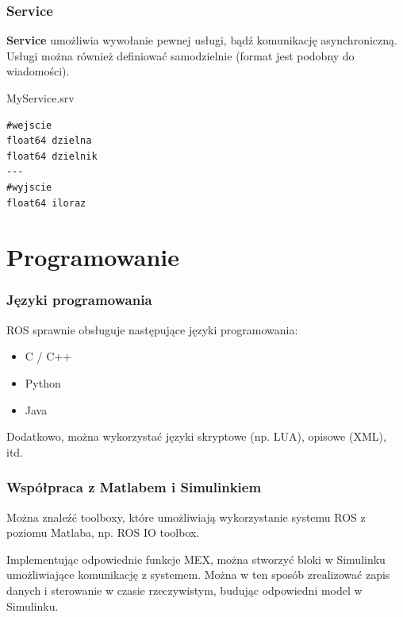 \documentclass[12pt,a4paper,portrait]{beamer}
\begin{document}
\begin{frame}[fragile]
\frametitle{Service}
\textbf{Service} umożliwia wywołanie pewnej usługi, bądź komunikację asynchroniczną. Usługi można również definiować samodzielnie (format jest podobny do wiadomości).

\begin{block}{MyService.srv}
\begin{verbatim}
#wejscie
float64 dzielna
float64 dzielnik
---
#wyjscie
float64 iloraz
\end{verbatim}
\end{block}
\end{frame}



\section{Programowanie}
\begin{frame}
\frametitle{Języki programowania}
ROS sprawnie obsługuje następujące języki programowania:
\begin{itemize}
\item C / C++
\item Python
\item Java
\end{itemize}

Dodatkowo, można wykorzystać języki skryptowe (np. LUA), opisowe (XML), itd.
\end{frame}

\begin{frame}
\frametitle{Współpraca z Matlabem i Simulinkiem}
Można znaleźć toolboxy, które umożliwiają wykorzystanie systemu ROS z poziomu Matlaba, np. ROS IO toolbox.

\vspace{1cm}
Implementując odpowiednie funkcje MEX, można stworzyć bloki w Simulinku umożliwiające komunikację z systemem. Można w ten sposób zrealizować zapis danych i sterowanie w czasie rzeczywistym, budując odpowiedni model w Simulinku.
\end{frame}
\end{document}
